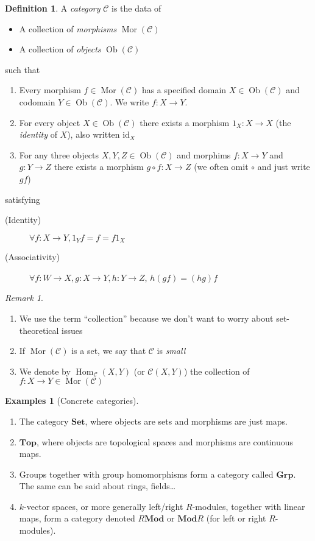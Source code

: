 \documentclass{article}
\newcommand{\id}{\mathrm{id}}
\newcommand{\cat}{\mathcal{C}}
\newcommand{\Set}{\mathbf{Set}}
\newcommand{\Top}{\mathbf{Top}}
\newcommand{\Grp}{\mathbf{Grp}}
\newcommand{\Mod}{\mathbf{Mod}}
\DeclareMathOperator{\Ob}{Ob}
\DeclareMathOperator{\Mor}{Mor}
\DeclareMathOperator{\Hom}{Hom}
\theoremstyle{plain}
\theoremstyle{definition}
\newtheorem{definition}[theorem]{Definition}
\newtheorem{examples}[theorem]{Examples}
\theoremstyle{remark}
\newtheorem*{remark}{Remark}
\begin{document}
\begin{definition}
    A \emph{category} $\cat$ is the data of
    \begin{itemize}
        \item A collection of \emph{morphisms} $\Mor(\cat)$
        \item A collection of \emph{objects} $\Ob(\cat)$
    \end{itemize}
    such that
    \begin{enumerate}
        \item Every morphism $f \in \Mor(\cat)$ has a specified domain $X \in \Ob(\cat)$ and codomain $Y \in \Ob(\cat)$. We write $f : X \to Y$.
        \item For every object $X \in \Ob(\cat)$ there exists a morphism $1_X : X \to X$ (the \emph{identity} of $X$), also written $\id_X$
        \item For any three objects $X,Y,Z \in \Ob(\cat)$ and morphims $f : X \to Y$ and $g : Y \to Z$ there exists a morphism $g\circ f : X \to Z$ (we often omit $\circ$ and just write $gf$)
    \end{enumerate}
    satisfying
    \begin{description}
        \item[(Identity)] $\forall f : X \to Y, 1_Y f = f = f 1_X$
        \item[(Associativity)] $\forall f : W \to X, g : X \to Y, h : Y \to Z$, $h(gf) = (hg)f$
    \end{description}
\end{definition}

\begin{remark} \leavevmode
    \begin{enumerate}
        \item We use the term ``collection'' because we don't want to worry about set-theoretical issues
        \item If $\Mor(\cat)$ is a set, we say that $\cat$ is \emph{small}
        \item We denote by $\Hom_\cat (X,Y)$ (or $\cat(X,Y)$) the collection of $f : X \to Y \in \Mor(\cat)$
    \end{enumerate}
\end{remark}

\begin{examples}[Concrete categories] \leavevmode
    \begin{enumerate}
        \item The category $\Set$, where objects are sets and morphisms are just maps.
        \item $\Top$, where objects are topological spaces and morphisms are continuous maps.
        \item Groups together with group homomorphisms form a category called $\Grp$. The same can be said about rings, fields\dots
        \item $k$-vector spaces, or more generally left/right $R$-modules, together with linear maps, form a category denoted $R\Mod$ or $\Mod R$ (for left or right $R$-modules).
    \end{enumerate}
\end{examples}
\end{document}
